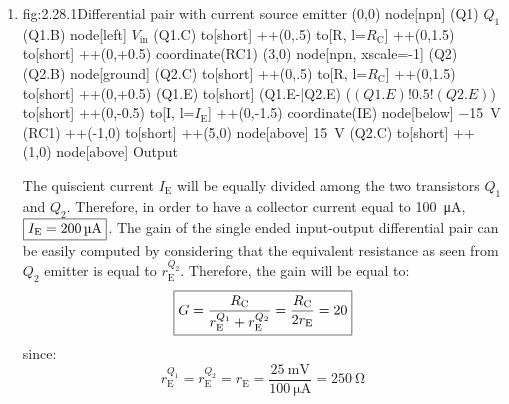 \begin{enumerate}
    \item
    \begin{circuit}{fig:2.28.1}{Differential pair with current source emitter}
        (0,0) node[npn] (Q1) {$Q_1$}
        (Q1.B) node[left] {$V_\text{in}$}
        (Q1.C) to[short] ++(0,.5)
        to[R, l=$R_\text{C}$] ++(0,1.5)
        to[short] ++(0,+0.5) coordinate(RC1)
        (3,0) node[npn, xscale=-1] (Q2) {}
        (Q2.B) node[ground] {}
        (Q2.C) to[short] ++(0,.5)
        to[R, l=$R_\text{C}$] ++(0,1.5)
        to[short] ++(0,+0.5)
        (Q1.E) to[short] (Q1.E-|Q2.E)
        ($(Q1.E)!0.5!(Q2.E)$) to[short] ++(0,-0.5)
        to[I, l=$I_\text{E}$] ++(0,-1.5) coordinate(IE)
        node[below] {\SI{-15}{\volt}}
        (RC1) ++(-1,0) to[short] ++(5,0)
        node[above] {\SI{+15}{\volt}}
        (Q2.C) to[short] ++(1,0)
        node[above] {Output}
    \end{circuit}

    The quiscient current $I_\text{E}$ will be equally divided among the two transistors $Q_1$ and $Q_2$. Therefore, in order to have a collector current equal to \SI{100}{\micro\ampere}, $\boxed{I_\text{E}=\SI{200}{\micro\ampere}}$.
    The gain of the single ended input-output differential pair can be easily computed by considering that the equivalent resistance as seen from $Q_2$ emitter is equal to $r_\text{E}^{Q_2}$. Therefore, the gain will be equal to:
    \[\boxed{G=\frac{R_\text{C}}{r_\text{E}^{Q_1}+r_\text{E}^{Q_2}}=\frac{R_\text{C}}{2r_\text{E}}=20}\]
    since:
    \[r_\text{E}^{Q_1}=r_\text{E}^{Q_2}=r_\text{E}=\frac{\SI{25}{\milli\volt}}{\SI{100}{\micro\ampere}}=\SI{250}{\ohm}\]


\end{enumerate}
